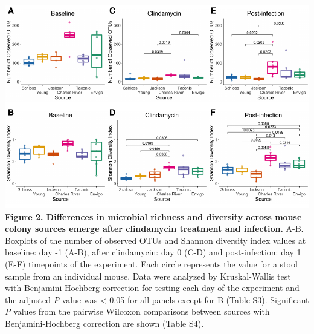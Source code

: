 \documentclass[11pt,]{article}
\begin{document}
\includegraphics{figure_2.pdf} \textbf{Figure 2. Differences in
microbial richness and diversity across mouse colony sources emerge
after clindamycin treatment and infection.} A-B. Boxplots of the number
of observed OTUs and Shannon diversity index values at baseline: day -1
(A-B), after clindamycin: day 0 (C-D) and post-infection: day 1 (E-F)
timepoints of the experiment. Each circle represents the value for a
stool sample from an individual mouse. Data were analyzed by
Kruskal-Wallis test with Benjamini-Hochberg correction for testing each
day of the experiment and the adjusted \emph{P} value was \textless{}
0.05 for all panels except for B (Table S3). Significant \emph{P} values
from the pairwise Wilcoxon comparisons between sources with
Benjamini-Hochberg correction are shown (Table S4).

\newpage
\end{document}
